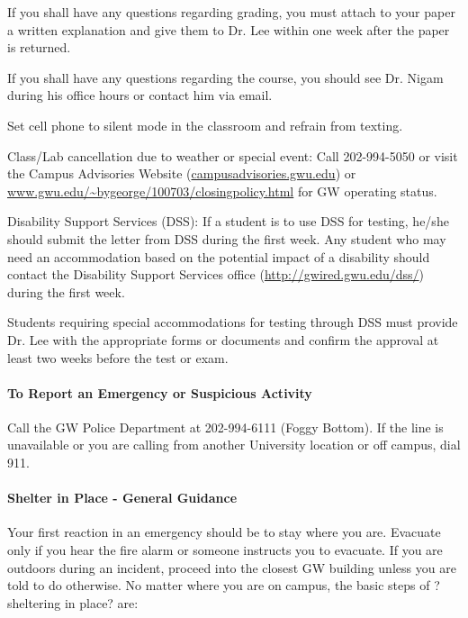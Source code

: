 \documentclass[10pt]{article}
\begin{document}
\begin{list}
\item If you shall have any questions regarding grading, you must attach to your paper a written explanation and give them to Dr. Lee within one week after the paper is returned.

\item If you shall have any questions regarding the course, you should see Dr. Nigam during his office hours or contact him via email.
\item Set cell phone to silent mode in the classroom and refrain from texting.
 
\item Class/Lab cancellation due to weather or special event: Call 202-994-5050 or visit the Campus Advisories Website (\url{campusadvisories.gwu.edu}) or \url{www.gwu.edu/~bygeorge/100703/closingpolicy.html} for GW operating status. 

\item Disability Support Services (DSS): If a student is to use DSS for testing, he/she should submit the letter from DSS during the first week. Any student who may need an accommodation based on the potential impact of a disability should contact the Disability Support Services office (\url{http://gwired.gwu.edu/dss/}) during the first week.

\item Students requiring special accommodations for testing through DSS must provide Dr. Lee with the appropriate forms or documents and confirm the approval at least two weeks before the test or exam.
\end{list}

\paragraph*{To Report an Emergency or Suspicious Activity}

Call the GW Police Department at 202-994-6111 (Foggy Bottom). If the line is unavailable or you are calling from another University location or off campus, dial 911.


\paragraph*{Shelter in Place - General Guidance}

Your first reaction in an emergency should be to stay where you are. Evacuate only if you hear the fire alarm or someone instructs you to evacuate. If you are outdoors during an incident, proceed into the closest GW building unless you are told to do otherwise. No matter where you are on campus, the basic steps of ?sheltering in place? are:
\end{document}
